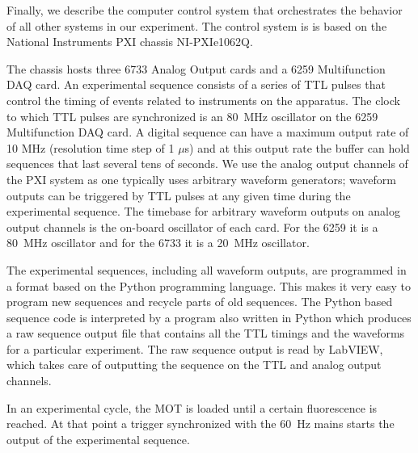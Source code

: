 Finally, we describe the computer control system that orchestrates the
behavior of all other systems in our experiment.   The control system is is
based on the National Instruments PXI chassis NI-PXIe1062Q.   

The chassis hosts
three 6733 Analog Output cards and a 6259 Multifunction DAQ card.   An experimental
sequence consists of a series of TTL pulses that control the timing of events
related to instruments on the apparatus.  The clock to which TTL pulses are
synchronized is an 80~MHz oscillator on the 6259 Multifunction DAQ card.    A
digital sequence can have a maximum output rate of 10 MHz (resolution time step
of 1 $\mu$s) and at this output rate the buffer can hold sequences that last
several tens of seconds.  We use the analog output channels of the PXI system
as one typically uses arbitrary waveform generators; waveform outputs can be
triggered by TTL pulses at any given time during the experimental sequence.
The timebase for arbitrary waveform outputs on analog output channels is the
on-board oscillator of each card.  For the 6259 it is a 80~MHz oscillator and
for the 6733 it is a 20~MHz oscillator.  

The experimental sequences, including all waveform outputs,  are programmed in
a format based on the Python programming language.  This makes it very easy to
program new sequences and recycle parts of old sequences.    The Python  based
sequence code is interpreted by a program also written in Python which produces
a raw sequence output file that contains all the TTL timings and the waveforms
for a particular experiment.  The raw sequence output is read by LabVIEW, which
takes care of outputting the sequence on the TTL and analog output channels.  

In an experimental cycle, the MOT is loaded until a certain fluorescence is
reached. At that point a trigger synchronized with the 60~Hz mains starts the
output of the experimental sequence. 


